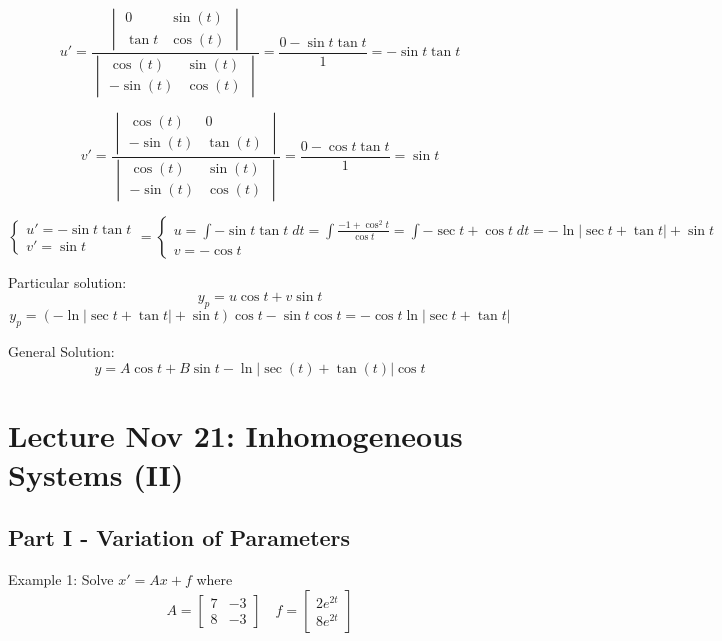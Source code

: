 \documentclass[12pt]{article}
\begin{document}
\[u' = \frac{\begin{vmatrix}
    0 & \sin(t)\\
    \tan t & \cos(t)
\end{vmatrix}}{\begin{vmatrix}
    \cos(t) & \sin(t)\\
    -\sin(t) & \cos(t)
\end{vmatrix}} = \frac{0 - \sin t \tan t}{1} = -\sin t \tan t\]

\[v' = \frac{\begin{vmatrix}
    \cos(t) & 0\\
    -\sin(t) & \tan(t)
\end{vmatrix}}{\begin{vmatrix}
    \cos(t) & \sin(t)\\
    -\sin(t) & \cos(t)
\end{vmatrix}} = \frac{0 - \cos t \tan t}{1} = \sin t\]

\[\begin{cases}
    u' = - \sin t \tan t\\
    v' = \sin t
\end{cases} = \begin{cases}
    u = \int - \sin t \tan t \; dt = \int \frac{-1 + \cos^2 t}{\cos t} = \int -\sec t + \cos t\; dt = - \ln | \sec t + \tan t| + \sin t\\
    v = - \cos t
\end{cases}\]

Particular solution:
\[y_p = u \cos t + v \sin t\]
\[y_p = (-\ln |\sec t + \tan t| + \sin t) \cos t - \sin t \cos t = - \cos t \ln |\sec t + \tan t|\]

General Solution:
\[\boxed{y = A \cos t + B \sin t - \ln | \sec(t) + \tan(t)| \cos t}\]

\section{Lecture Nov 21: Inhomogeneous Systems (II)}
\subsection*{Part I - Variation of Parameters}
Example 1: Solve $x' = Ax + f$ where 
\[A = \begin{bmatrix}
    7 & -3\\
    8 & -3
\end{bmatrix} \quad f = \begin{bmatrix}
    2e^{2t}\\
    8e^{2t}
\end{bmatrix}\] 
\end{document}
